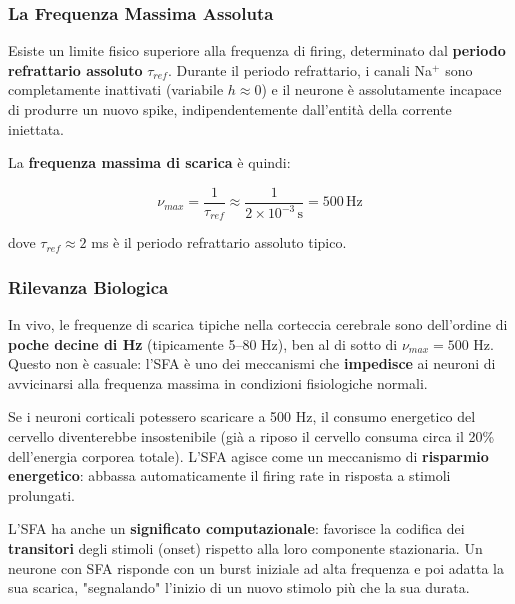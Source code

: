 \subsubsection{La Frequenza Massima Assoluta}

Esiste un limite fisico superiore alla frequenza di firing, determinato dal \textbf{periodo refrattario assoluto} $\tau_{ref}$. Durante il periodo refrattario, i canali Na$^+$ sono completamente inattivati (variabile $h \approx 0$) e il neurone è assolutamente incapace di produrre un nuovo spike, indipendentemente dall'entità della corrente iniettata.

La \textbf{frequenza massima di scarica} è quindi:

\begin{equation}
\nu_{max} = \frac{1}{\tau_{ref}} \approx \frac{1}{2 \times 10^{-3} \, \text{s}} = 500 \, \text{Hz}
\end{equation}

dove $\tau_{ref} \approx 2$ ms è il periodo refrattario assoluto tipico.

\subsubsection{Rilevanza Biologica}

In vivo, le frequenze di scarica tipiche nella corteccia cerebrale sono dell'ordine di \textbf{poche decine di Hz} (tipicamente 5–80 Hz), ben al di sotto di $\nu_{max} = 500$ Hz. Questo non è casuale: l'SFA è uno dei meccanismi che \textbf{impedisce} ai neuroni di avvicinarsi alla frequenza massima in condizioni fisiologiche normali.

\begin{tcolorbox}[colback=gray!5, colframe=gray!40, arc=2mm, boxrule=0.5pt]
 Se i neuroni corticali potessero scaricare a 500 Hz, il consumo energetico del cervello diventerebbe insostenibile (già a riposo il cervello consuma circa il 20\% dell'energia corporea totale). L'SFA agisce come un meccanismo di \textbf{risparmio energetico}: abbassa automaticamente il firing rate in risposta a stimoli prolungati.
\end{tcolorbox}

L'SFA ha anche un \textbf{significato computazionale}: favorisce la codifica dei \textbf{transitori} degli stimoli (onset) rispetto alla loro componente stazionaria. Un neurone con SFA risponde con un burst iniziale ad alta frequenza e poi adatta la sua scarica, "segnalando" l'inizio di un nuovo stimolo più che la sua durata.


